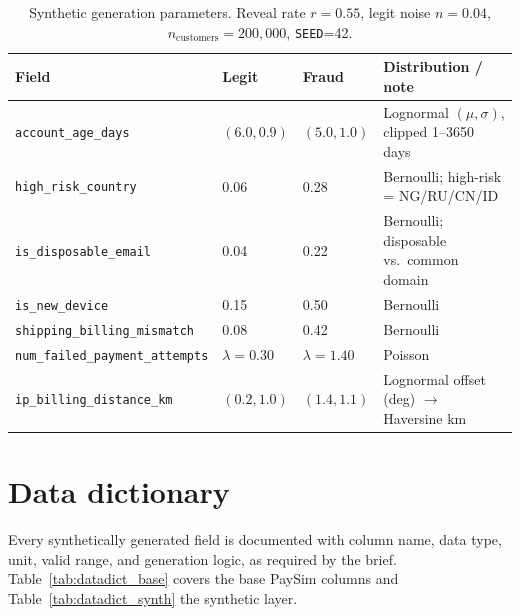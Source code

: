 \documentclass[11pt,a4paper]{report}
\newcommand{\code}[1]{\texttt{\small #1}}
\begin{document}
\begin{table}[h]
\centering
\small
\begin{tabularx}{\textwidth}{@{}l l l Y@{}}
\toprule
\textbf{Field} & \textbf{Legit} & \textbf{Fraud} & \textbf{Distribution / note}\\
\midrule
\code{account\_age\_days}            & $(6.0, 0.9)$ & $(5.0, 1.0)$ & Lognormal $(\mu,\sigma)$, clipped 1–3650 days\\
\code{high\_risk\_country}           & 0.06 & 0.28 & Bernoulli; high-risk = NG/RU/CN/ID\\
\code{is\_disposable\_email}         & 0.04 & 0.22 & Bernoulli; disposable vs.\ common domain\\
\code{is\_new\_device}               & 0.15 & 0.50 & Bernoulli\\
\code{shipping\_billing\_mismatch}   & 0.08 & 0.42 & Bernoulli\\
\code{num\_failed\_payment\_attempts}& $\lambda=0.30$ & $\lambda=1.40$ & Poisson\\
\code{ip\_billing\_distance\_km}     & $(0.2,1.0)$ & $(1.4,1.1)$ & Lognormal offset (deg) $\to$ Haversine km\\
\bottomrule
\end{tabularx}
\caption{Synthetic generation parameters. Reveal rate $r=0.55$, legit noise $n=0.04$,
$n_{\text{customers}}=200{,}000$, \code{SEED}=42.}
\label{tab:genparams}
\end{table}

\section{Data dictionary}

Every synthetically generated field is documented with column name, data type, unit, valid
range, and generation logic, as required by the brief. Table~\ref{tab:datadict_base} covers
the base PaySim columns and Table~\ref{tab:datadict_synth} the synthetic layer.
\end{document}
